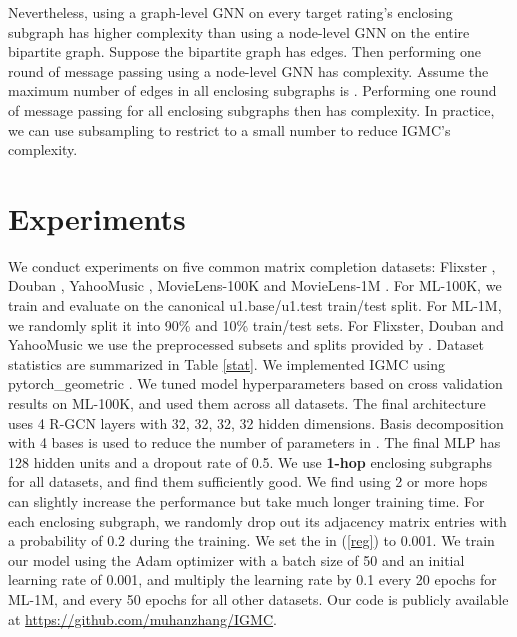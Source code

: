 \documentclass{article} \usepackage{iclr2020_conference,times}
\begin{document}
Nevertheless, using a graph-level GNN on every target rating's enclosing subgraph has higher complexity than using a node-level GNN on the entire bipartite graph. Suppose the bipartite graph has  edges. Then performing one round of message passing using a node-level GNN has  complexity. Assume the maximum number of edges in all enclosing subgraphs is . Performing one round of message passing for all enclosing subgraphs then has  complexity. In practice, we can use subsampling to restrict  to a small number to reduce IGMC's complexity.


















\section{Experiments}
We conduct experiments on five common matrix completion datasets: Flixster \citep{jamali2010matrix}, Douban \citep{ma2011recommender}, YahooMusic \citep{dror2011yahoo}, MovieLens-100K and MovieLens-1M \citep{miller2003movielens}. For ML-100K, we train and evaluate on the canonical u1.base/u1.test train/test split. For ML-1M, we randomly split it into 90\% and 10\% train/test sets. For Flixster, Douban and YahooMusic we use the preprocessed subsets and splits provided by \citep{monti2017geometric}. Dataset statistics are summarized in Table \ref{stat}. We implemented IGMC using pytorch\_geometric \citep{Fey/Lenssen/2019}. We tuned model hyperparameters based on cross validation results on ML-100K, and used them across all datasets. The final architecture uses 4 R-GCN layers with 32, 32, 32, 32 hidden dimensions. Basis decomposition with 4 bases is used to reduce the number of parameters in  \citep{schlichtkrull2018modeling}. The final MLP has 128 hidden units and a dropout rate of 0.5. We use \textbf{1-hop} enclosing subgraphs for all datasets, and find them sufficiently good. We find using 2 or more hops can slightly increase the performance but take much longer training time. For each enclosing subgraph, we randomly drop out its adjacency matrix entries with a probability of 0.2 during the training. We set the  in (\ref{reg}) to 0.001. We train our model using the Adam optimizer \citep{kingma2014adam} with a batch size of 50 and an initial learning rate of 0.001, and multiply the learning rate by 0.1 every 20 epochs for ML-1M, and every 50 epochs for all other datasets. Our code is publicly available at \url{https://github.com/muhanzhang/IGMC}.
\end{document}
